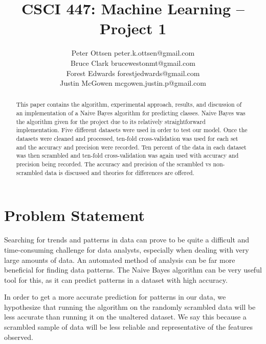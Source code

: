\documentclass[twoside,11pt]{article}
\begin{document}
\title{CSCI 447: Machine Learning -- Project 1}

\author{\name Peter Ottsen \email peter.k.ottsen@gmail.com\\
\name Bruce Clark \email brucewestonmt@gmail.com\\
\name Forest Edwards \email forestjedwards@gmail.com\\
\name Justin McGowen \email mcgowen.justin.p@gmail.com}


\maketitle

\begin{abstract}%

This paper contains the algorithm, experimental approach, results, and discussion of an implementation of a Naive Bayes algorithm \citep{mit15} for predicting classes.  Naive Bayes was the algorithm given for the project due to its relatively straightforward implementation. Five different datasets were used in order to test our model. Once the datasets were cleaned and processed, ten-fold cross-validation was used for each set and the accuracy and precision were recorded. Ten percent of the data in each dataset was then scrambled and ten-fold cross-validation was again used with accuracy and precision being recorded.  The accuracy and precision of the scrambled vs non-scrambled data is discussed and theories for differences are offered.

\end{abstract}

\section{Problem Statement}

Searching for trends and patterns in data can prove to be quite a difficult and time-consuming challenge for data analysts, especially when dealing with very large amounts of data.  An automated method of analysis can be far more beneficial for finding data patterns.  The Naive Bayes algorithm can be very useful tool for this, as it can predict patterns in a dataset with high accuracy.  

In order to get a more accurate prediction for patterns in our data, we hypothesize that running the algorithm on the randomly scrambled data will be less accurate than running it on the unaltered dataset.  We say this because a scrambled sample of data will be less reliable and representative of the features observed.
\end{document}

